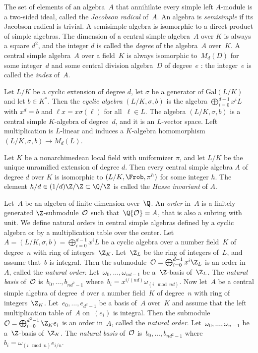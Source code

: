 The set of elements of an algebra~$A$ that annihilate every simple left
$A$-module is a two-sided ideal, called the \emph{Jacobson radical} of~$A$.
An algebra is \emph{semisimple} if its Jacobson radical is trivial. A
semisimple algebra is isomorphic to a direct product of simple algebras. The
dimension of a central simple algebra~$A$ over $K$ is always a square $d^2$,
and the integer $d$ is called the \emph{degree} of the algebra~$A$ over~$K$.
A central simple algebra~$A$ over a field~$K$ is always isomorphic to~$M_d(D)$
for some integer~$d$ and some central division algebra~$D$ of degree~$e$ : the
integer~$e$ is called the \emph{index} of~$A$.

Let $L/K$ be a cyclic extension of degree $d$, let $\sigma$ be a
generator of $\text{Gal}(L/K)$ and let $b\in K^*$. Then the
\emph{cyclic algebra} $(L/K,\sigma,b)$ is the algebra
$\bigoplus_{i=0}^{d-1}x^iL$ with $x^d=b$ and $\ell x=x\sigma(\ell)$ for
all~$\ell\in L$. The algebra $(L/K,\sigma,b)$ is a central simple $K$-algebra
of degree~$d$, and it is an $L$-vector space. Left multiplication is
$L$-linear and induces a $K$-algebra homomorphism $(L/K,\sigma,b)\to M_d(L)$.

Let $K$ be a nonarchimedean local field with uniformizer $\pi$, and let
$L/K$ be the unique unramified extension of degree $d$. Then every central
simple algebra $A$ of degree $d$ over $K$ is isomorphic to
$(L/K, \Frob, \pi^h)$ for some integer $h$. The element $h/d\in
(1/d)\Z/\Z\subset\Q/\Z$ is called the \emph{Hasse invariant} of $A$.

Let~$A$ be an algebra of finite dimension over~$\Q$. An \emph{order}
in~$A$ is a finitely generated $\Z$-submodule~${\cal O}$ such
that~$\Q{\cal O} = A$, that is also a subring with unit. We define natural
orders in central simple algebras defined by a cyclic algebra or by a
multiplication table over the center. Let~$A = (L/K,\sigma,b) =
\bigoplus_{i=0}^{d-1}x^iL$ be a cyclic algebra over a number field~$K$ of
degree~$n$ with ring of integers~$\Z_K$. Let~$\Z_L$ be the ring of integers
of~$L$, and assume that~$b$ is integral. Then the submodule~${\cal O} =
\bigoplus_{i=0}^{d-1}x^i\Z_L$ is an order in~$A$, called the
\emph{natural order}. Let~$\omega_0,\dots,\omega_{nd-1}$ be a~$\Z$-basis
of~$\Z_L$. The \emph{natural basis} of~${\cal O}$ is~$b_0,\dots,b_{nd^2-1}$
where~$b_i = x^{i/(nd)}\omega_{(i \mod nd)}$. Now let~$A$ be a central simple
algebra of degree~$d$ over a number field~$K$ of degree~$n$ with ring of
integers~$\Z_K$. Let~$e_0,\dots,e_{d^2-1}$ be a basis of~$A$ over~$K$ and
assume that the left multiplication table of~$A$ on~$(e_i)$ is integral. Then
the submodule~${\cal O} = \bigoplus_{i=0}^{d^2-1}\Z_K e_i$ is an order
in~$A$, called the \emph{natural order}. Let~$\omega_0,\dots,\omega_{n-1}$ be
a~$\Z$-basis of~$\Z_K$. The \emph{natural basis} of~${\cal O}$
is~$b_0,\dots,b_{nd^2-1}$ where~$b_i = \omega_{(i \mod n)}e_{i/n}$.

